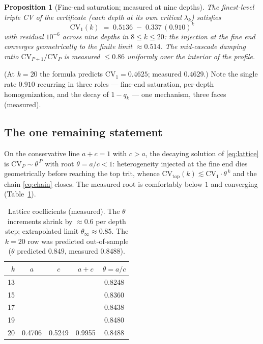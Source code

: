 \documentclass[11pt]{article}
\newtheorem{proposition}[theorem]{Proposition}
\theoremstyle{definition}
\theoremstyle{remark}
\newcommand{\CV}{\mathrm{CV}}
\newcommand{\lam}{\lambda}
\begin{document}
\begin{proposition}[Fine-end saturation; measured at nine depths]\label{prop:cv1}
The finest-level triple CV of the certificate (each depth at its own critical
$\lam_k$) satisfies
\[
\CV_1(k) \;=\; 0.5136 \;-\; 0.337\,(0.910)^{k}
\]
with residual $10^{-6}$ across nine depths in $8 \leq k \leq 20$: the
injection at the fine end converges geometrically to the finite limit
$\approx 0.514$. The mid-cascade damping ratio $\CV_{P+1}/\CV_P$ is measured
$\leq 0.86$ uniformly over the interior of the profile.
\end{proposition}

(At $k = 20$ the formula predicts $\CV_1 = 0.4625$; measured $0.4629$.) Note
the single rate $0.910$ recurring in three roles --- fine-end saturation,
per-depth homogenization, and the decay of $1 - q_k$ --- one mechanism, three
faces (measured).

\subsection{The one remaining statement}

On the conservative line $a + c = 1$ with $c > a$, the decaying solution of
\eqref{eq:lattice} is $\CV_P \sim \theta^{\,P}$ with root
$\theta = a/c < 1$: heterogeneity injected at the fine end dies geometrically
before reaching the top trit, whence
$\CV_{\mathrm{top}}(k) \lesssim \CV_1 \cdot \theta^{\,k}$ and the chain
\eqref{eq:chain} closes. The measured root is comfortably below $1$ and
converging (Table~\ref{tab:theta}).

\begin{table}[ht]
\centering
\begin{tabular}{r c c c c}
\hline
$k$ & $a$ & $c$ & $a + c$ & $\theta = a/c$ \\
\hline
13 &        &        &        & 0.8248 \\
15 &        &        &        & 0.8360 \\
17 &        &        &        & 0.8438 \\
19 &        &        &        & 0.8480 \\
20 & 0.4706 & 0.5249 & 0.9955 & 0.8488 \\
\hline
\end{tabular}
\caption{Lattice coefficients (measured). The $\theta$ increments shrink by
$\approx 0.6$ per depth step; extrapolated limit $\theta_\infty \approx 0.85$.
The $k = 20$ row was predicted out-of-sample ($\theta$ predicted $0.849$,
measured $0.8488$).}
\label{tab:theta}
\end{table}
\end{document}
